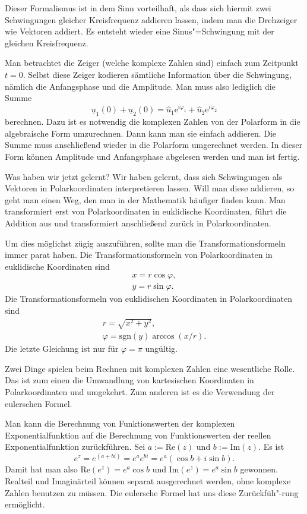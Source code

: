 \documentclass[a4paper,10pt,fleqn,twocolumn,twoside]{article}
\begin{document}
Dieser Formalismus ist in dem Sinn vorteilhaft, als dass sich hiermit
zwei Schwingungen gleicher Kreisfrequenz addieren lassen, indem man
die Drehzeiger wie Vektoren addiert. Es entsteht wieder eine
Sinus"=Schwingung mit der gleichen Kreisfrequenz.

Man betrachtet die Zeiger (welche komplexe Zahlen sind) einfach zum
Zeitpunkt \(t=0\). Selbst diese Zeiger kodieren sämtliche Information
über die Schwingung, nämlich die Anfangsphase und die Amplitude. Man
muss also lediglich die Summe
\[\underline{u}_1(0)+\underline{u}_2(0)
= \hat u_1\mathrm{e}^{i\varphi_1}+\hat u_2\mathrm{e}^{i\varphi_2}\]
berechnen. Dazu ist es notwendig die komplexen Zahlen von der
Polarform in die algebraische Form umzurechnen.
Dann kann man sie einfach addieren. Die Summe muss anschließend wieder
in die Polarform umgerechnet werden. In dieser Form können Amplitude
und Anfangsphase abgelesen werden und man ist fertig.

Was haben wir jetzt gelernt? Wir haben gelernt, dass sich Schwingungen
als Vektoren in Polarkoordinaten interpretieren lassen. Will man diese
addieren, so geht man einen Weg, den man in der Mathematik häufiger
finden kann. Man transformiert erst von Polarkoordinaten in
euklidische Koordinaten, führt die Addition aus und transformiert
anschließend zurück in Polarkoordinaten.

Um dies möglichst zügig auszuführen, sollte man die
Transformationsformeln immer parat haben. Die Transformationsformeln
von Polarkoordinaten in euklidische Koordinaten sind
\begin{gather*}
x = r\cos\varphi,\\
y = r\sin\varphi.
\end{gather*}
\noindent
Die Transformationsformeln von euklidischen Koordinaten in
Polarkoordinaten sind
\begin{gather*}
r = \sqrt{x^2+y^2},\\
\varphi = \mathrm{sgn}(y)\arccos(x/r).
\end{gather*}
Die letzte Gleichung ist nur für \(\varphi=\pi\) ungültig.

Zwei Dinge spielen beim Rechnen mit komplexen Zahlen eine
wesentliche Rolle. Das ist zum einen die Umwandlung von kartesischen
Koordinaten in Polarkoordinaten und umgekehrt. Zum anderen ist es
die Verwendung der eulerschen Formel.

Man kann die Berechnung von Funktionswerten der komplexen
Exponentialfunktion auf die Berechnung von Funktionswerten
der reellen Exponentialfunktion zurückführen.
Sei \(a:=\mathrm{Re}(z)\) und \(b:=\mathrm{Im}(z)\). Es ist
\[e^z = e^{(a+bi)} = e^a e^{bi} = e^a(\cos b+i\sin b).\]
Damit hat man also \(\mathrm{Re}(e^z) = e^a\cos b\) und
\(\mathrm{Im}(e^z) = e^a\sin b\) gewonnen. Realteil und Imaginärteil
können separat ausgerechnet werden, ohne komplexe Zahlen benutzen
zu müssen. Die eulersche Formel hat uns diese Zurückfüh"-rung
ermöglicht.
\end{document}
